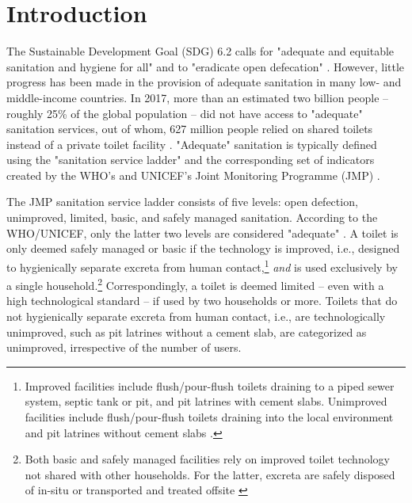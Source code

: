 \documentclass[natbib]{svjour3}                     %
\begin{document}
\section{Introduction}
\label{sec:intro}
The Sustainable Development Goal (SDG) 6.2 calls for "adequate and equitable sanitation and hygiene for all" and to "eradicate open defecation" \citep{UN-DESA2020}. However, little progress has been made in the provision of adequate sanitation in many low- and middle-income countries. In 2017, more than an estimated two billion people -- roughly 25\% of the global population -- did not have access to "adequate" sanitation services, out of whom, 627 million people relied on shared toilets instead of a private toilet facility \citep{JMP2018}. "Adequate" sanitation is typically defined using the "sanitation service ladder" and the corresponding set of indicators created by the WHO's and UNICEF's Joint Monitoring Programme (JMP) \citep{Jmp2019}. 

The JMP sanitation service ladder consists of five levels: open defection, unimproved, limited, basic, and safely managed sanitation. According to the WHO/UNICEF, only the latter two levels are considered "adequate" \citep{JMP2018}. A toilet is only deemed safely managed or basic if the technology is improved, i.e., designed to hygienically separate excreta from human contact,\footnote{Improved facilities include flush/pour-flush toilets draining to a piped sewer system, septic tank or pit, and pit latrines with cement slabs. Unimproved facilities include flush/pour-flush toilets draining into the local environment and pit latrines without cement slabs \citep{Jmp2019}.} \textit{and} is used exclusively by a single household.\footnote{Both basic and safely managed facilities rely on improved toilet technology not shared with other households. For the latter, excreta are safely disposed of in-situ or transported and treated offsite \citep{Jmp2019}} Correspondingly, a toilet is deemed limited -- even with a high technological standard -- if used by two households or more. Toilets that do not hygienically separate excreta from human contact, i.e., are technologically unimproved, such as pit latrines without a cement slab, are categorized as unimproved, irrespective of the number of users.
\end{document}

